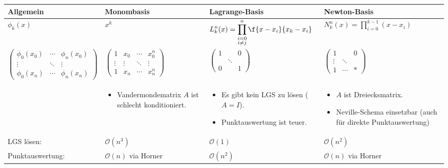 \documentclass[11pt]{scrbook}
\begin{document}
\begin{table}[H]
	\centering
	\begin{tabular}{p{}|p{}|p{}|p{}}
		\centering Allgemein & \centering Monombasis & \centering Lagrange-Basis & \centering Newton-Basis \tabularnewline \hline

		\centering $\displaystyle \phi_k(x)$ & 
		\centering $\displaystyle x^k$ & 
		\centering $\displaystyle L_k^n(x) = \prod_{\substack{i=0 \\ i\neq j}}^n \f{x-x_i}{x_k-x_i}$ & 
		\centering $\displaystyle N_k^n(x) = \prod_{i=0}^{k-1} (x-x_i)$ \tabularnewline

		\centering $\begin{pmatrix}
			\phi_0(x_0) & \cdots & \phi_n(x_0) \\
			\vdots & \ddots & \vdots \\
			\phi_0(x_n) & \cdots & \phi_n(x_n)
		\end{pmatrix}$ &
		\centering $\begin{pmatrix}
			1 & x_0 & \cdots & x_0^n \\
			\vdots & \vdots & \ddots & \vdots \\
			1 & x_n & \cdots & x_n^n
		\end{pmatrix}$ &
		\centering $\begin{pmatrix}
			1 & & 0 \\
			 & \ddots &   \\
			0 & & 1
		\end{pmatrix}$ &
		\centering $\begin{pmatrix}
			1 &  & 0 \\
			\vdots & \ddots &  \\
			1 & \cdots & *
		\end{pmatrix}$ \tabularnewline

		&
		\begin{itemize}
			\item Van\-der\-mon\-de\-ma\-trix $A$ ist schlecht konditioniert.
		\end{itemize} &
		\begin{itemize}
			\item Es gibt kein LGS zu lösen ($A=I$).
			\item Punktauswertung ist teuer.
		\end{itemize} &
		\begin{itemize}
			\item $A$ ist Dreiecksmatrix.
			\item Neville-Schema einsetzbar (auch für direkte Punktauswertung)
		\end{itemize} \\

		LGS lösen: & \centering $\mathcal O(n^3)$ & \centering $\mathcal O(1)$ & \centering $\mathcal O(n^2)$ \tabularnewline
		Punktauswertung: & \centering $\mathcal O(n)$ via Horner & \centering $\mathcal O(n^2)$ & \centering $\mathcal O(n)$ via Horner \tabularnewline
	\end{tabular}
\end{table}
\end{document}

